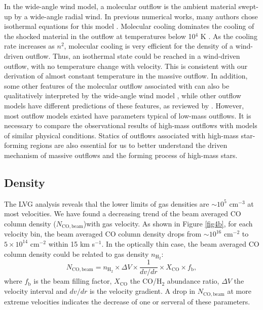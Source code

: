In the wide-angle wind model, a molecular outflow is the ambient material swept-up by a wide-angle radial wind. In previous numerical works, many authors chose isothermal equations for this model \citep{1996ApJ...472..211L,2001ApJ...557..429L}. Molecular cooling dominates the cooling of the shocked material in the outflow at temperatures below 10$^4$ K \citep{1997IAUS..182..181H}. As the cooling rate increases as $n^2$, molecular cooling is very efficient for the density of a wind-driven outflow. Thus, an isothermal state could be reached in a wind-driven outflow, with no temperature change with velocity. This is consistent with our derivation of almost constant temperature in the massive  outflow. In addition, some other features of the molecular outflow associated with  can also be qualitatively interpreted by the wide-angle wind model \citep{2009ApJ...696...66Q}, while other outflow models have different predictions of these features, as reviewed by \citet{2007prpl.conf..245A}. However, most outflow models existed have parameters typical of low-mass outflows. It is necessary to compare the observational results of high-mass outflows with models of similar physical conditions. Statics of outflows associated with high-mass star-forming regions are also essential for us to better understand the driven mechanism of massive outflows and the forming process of high-mass stars.

\subsection{Density}

The LVG analysis reveals thal the lower limits of gas densities are $\sim 10^5$ cm$^{-3}$ at most velocities. We have found a decreasing trend of the beam averaged CO column density ($N_{\mathrm{CO,beam}}$)with gas velocity. As shown in Figure \ref{fig4b}, for each velocity bin, the beam averaged CO column density drops from $\sim 10^{16} $ cm$^{-2}$ to $5 \times 10^{14}$ cm$^{-2}$ within 15 km s$^{-1}$. In the optically thin case, the beam averaged CO column density could be related to gas density $n_{\mathrm{H}_2}$: 
\begin{equation}
N_{\mathrm{CO,beam}} = n_{\mathrm{H}_2} \times \Delta V \times \frac{1}{dv/dr} \times X_{\mathrm{CO}} \times f_{\mathrm{b}}, 
\end{equation}
where $f_{\mathrm{b}}$ is the beam filling factor, $X_{\mathrm{CO}}$ the CO/H$_2$ abundance ratio, $\Delta V$ the velocity interval and $dv/dr$ is the velocity gradient. A drop in $N_{\mathrm{CO,beam}}$ at more extreme velocities indicates the decrease of one or serveral of these parameters. 

